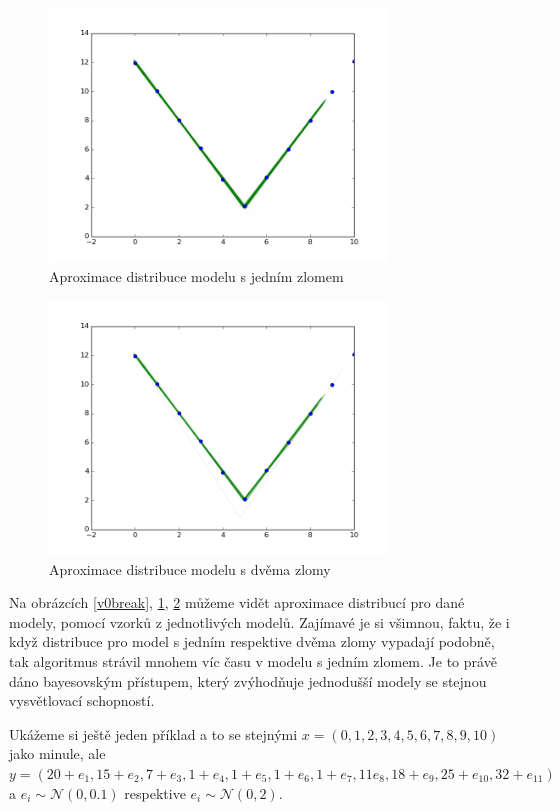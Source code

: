 \documentclass[czech,master,public,dept470,male,cpdeclaration,oneside, python]{diploma}
\begin{document}
\begin{figure}
	[H]\centering\includegraphics[width=0.8\textwidth]{images/distribution_lines_V_1break.png}\caption{Aproximace distribuce modelu s jedním zlomem}\label{v1break}
\end{figure}
\begin{figure}
	[H]\centering\includegraphics[width=0.8\textwidth]{images/distribution_lines_V_2breaks.png}\caption{Aproximace distribuce modelu s dvěma zlomy}\label{v2break}
\end{figure} \par
Na obrázcích \ref{v0break}, \ref{v1break}, \ref{v2break} můžeme vidět aproximace distribucí pro dané modely, pomocí vzorků z jednotlivých modelů. Zajímavé je si všimnou, faktu, že i když distribuce pro model s jedním respektive dvěma zlomy vypadají podobně, tak algoritmus strávil mnohem víc času v modelu s jedním zlomem. Je to právě dáno bayesovským přístupem, který zvýhodňuje jednodušší modely se stejnou vysvětlovací schopností. \par
Ukážeme si ještě jeden příklad a to se stejnými $x = (0, 1, 2, 3, 4, 5, 6, 7, 8, 9, 10)$ jako minule, ale $y = (20 + e_1, 15 + e_2, 7 + e_3, 1 + e_4, 1 + e_5, 1 + e_6, 1 + e_7, 11 e_8, 18 + e_9 ,25 + e_10, 32 + e_11)$ a $e_i \sim \mathcal{N}(0, 0.1)$ respektive $e_i \sim \mathcal{N}(0, 2)$. \par
\end{document}
